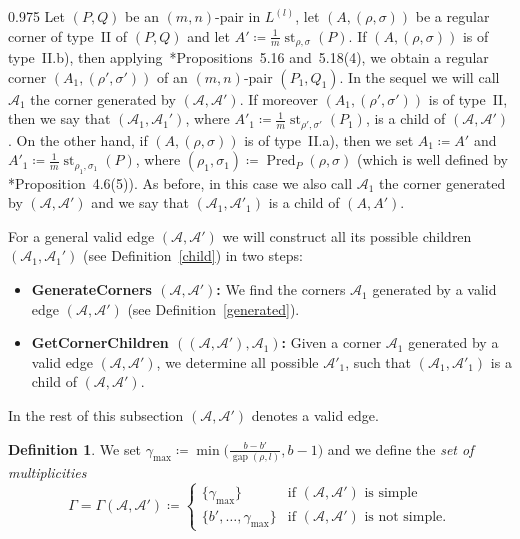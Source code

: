 \documentclass[reqno,a4paper,twoside]{amsart}
\theoremstyle{definition}
\newtheorem{definition}[theorem]{Definition}
\theoremstyle{remark}
\DeclareMathOperator{\gap}{gap}
\DeclareMathOperator{\st}{st}
\DeclareMathOperator{\Pred}{Pred}
\begin{document}
\begin{spacing}{0.975}
Let $(P,Q)$ be an $(m,n)$-pair in $L^{(l)}$, let $(A,(\rho,\sigma))$ be a regular corner of type~II of $(P,Q)$ and let $A'\coloneqq \frac{1}{m}\st_{\rho,\sigma}(P)$. If $(A,(\rho,\sigma))$ is of type~II.b), then applying~\cite{GGV1}*{Propositions~5.16 and~5.18(4)}, we obtain a regular corner $(A_1,(\rho',\sigma'))$ of an $(m,n)$-pair $(P_1,Q_1)$. In the sequel we will call $\mathcal{A}_1$ the corner generated by $(\mathcal{A},\mathcal{A}')$. If moreover $(A_1,(\rho',\sigma'))$ is of type~II, then we say that $(\mathcal{A}_1,\mathcal{A}_1')$, where $A'_1\coloneqq \frac{1}{m}\st_{\rho',\sigma'}(P_1)$, is a child of $(\mathcal{A},\mathcal{A}')$. On the other hand, if $(A,(\rho,\sigma))$ is of type~II.a), then we set $A_1\coloneqq A'$ and $A'_1\coloneqq \frac 1m \st_{\rho_1,\sigma_1}(P)$, where $(\rho_1,\sigma_1)\coloneqq \Pred_P(\rho,\sigma)$ (which is well defined by \cite{GGV1}*{Proposition~4.6(5)}). As before, in this case we also call $\mathcal{A}_1$ the corner generated by $(\mathcal{A},\mathcal{A}')$ and we say that $(\mathcal{A}_1,\mathcal{A}'_1)$ is a child of $(A,A')$.

\smallskip

For a general valid edge $(\mathcal{A},\mathcal{A}')$ we will construct all its possible children $(\mathcal{A}_1,\mathcal{A}_1')$ (see Definition~\ref{child}) in two steps:

\begin{itemize}[itemsep=0.5ex,topsep=0.5ex]

\item[-] {\bf GenerateCorners $(\mathcal{A},\mathcal{A}')$:} We find the corners $\mathcal{A}_1$ generated by a valid edge  $(\mathcal{A},\mathcal{A}')$ (see Definition~\ref{generated}).

\item[-] {\bf GetCornerChildren $((\mathcal{A},\mathcal{A}'),\mathcal{A}_1)$:} Given a corner $\mathcal{A}_1$ generated by a valid edge $(\mathcal{A},\mathcal{A}')$, we determine all possible $\mathcal{A}'_1$, such that $(\mathcal{A}_1,\mathcal{A}'_1)$ is a child of $(\mathcal{A},\mathcal{A}')$.

\end{itemize}

\smallskip

In the rest of this subsection $(\mathcal{A},\mathcal{A}')$ denotes a valid edge.

\begin{definition}
We set $\gamma_{\max}\coloneqq \min\bigl(\frac{b-b'}{\gap(\rho,l)},b-1\bigr)$ and we define the {\em set of multiplicities}
$$
\Gamma=\Gamma(\mathcal{A},\mathcal{A}')\coloneqq \begin{cases}\{\gamma_{\max}\}& \text{if $(\mathcal{A},\mathcal{A}')$ is simple}\\ \{b',\dots,\gamma_{\max}\}&\text{if $(\mathcal{A},\mathcal{A}')$ is not simple}.
\end{cases}
$$
\end{definition}


\end{spacing}
\end{document}
